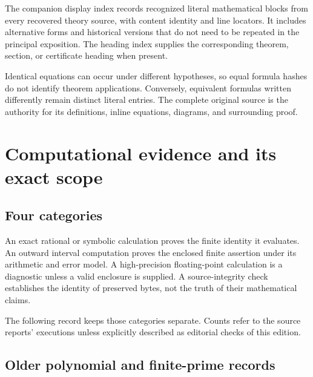 \documentclass[
  10pt,
  a4paper,
  10pt,
  oneside,
  openany]{book}
\begin{document}
The companion display index records recognized literal mathematical
blocks from every recovered theory source, with content identity and
line locators. It includes alternative forms and historical versions
that do not need to be repeated in the principal exposition. The heading
index supplies the corresponding theorem, section, or certificate
heading when present.

Identical equations can occur under different hypotheses, so equal
formula hashes do not identify theorem applications. Conversely,
equivalent formulas written differently remain distinct literal entries.
The complete original source is the authority for its definitions,
inline equations, diagrams, and surrounding proof.

\section{Computational evidence and its exact
scope}\label{app-computations}

\subsection{Four categories}\label{four-categories}

An exact rational or symbolic calculation proves the finite identity it
evaluates. An outward interval computation proves the enclosed finite
assertion under its arithmetic and error model. A high-precision
floating-point calculation is a diagnostic unless a valid enclosure is
supplied. A source-integrity check establishes the identity of preserved
bytes, not the truth of their mathematical claims.

The following record keeps those categories separate. Counts refer to
the source reports' executions unless explicitly described as editorial
checks of this edition.

\subsection{Older polynomial and finite-prime
records}\label{older-polynomial-and-finite-prime-records}
\end{document}
